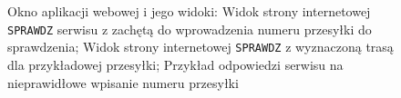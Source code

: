 \documentclass[eng,printmode,oneside]{mgr}
\begin{document}
\begin{figure}
\centering
\captionsetup{justification=centering,margin=1cm}
\caption{Okno aplikacji webowej i jego widoki:  Widok strony
internetowej \texttt{SPRAWDZ} serwisu z zachętą do wprowadzenia numeru przesyłki do
sprawdzenia;  Widok strony internetowej \texttt{SPRAWDZ} z
wyznaczoną trasą dla przykładowej przesyłki;  Przykład
odpowiedzi serwisu na nieprawidłowe wpisanie numeru przesyłki}
\end{figure}
\end{document}
